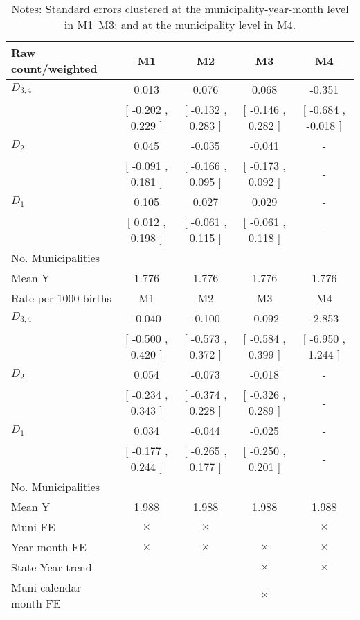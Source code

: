 \begin{table}[!ht]
\centering
\caption{Effects of Drought on very_preterm}\label{tab:twfe_very_preterm}
\fontsize{10pt}{12pt}\selectfont
\begin{tabular}{lcccc}
\toprule
  Raw count/weighted &\multicolumn{1}{c}{M1}&\multicolumn{1}{c}{M2}&\multicolumn{1}{c}{M3}&\multicolumn{1}{c}{M4} \\
\midrule
 $ D_{3,4} $ &     0.013 &     0.076 &     0.068 &    -0.351 \\ 
 & [    -0.202 ,     0.229 ] & [    -0.132 ,     0.283 ] & [    -0.146 ,     0.282 ] & [    -0.684 ,    -0.018 ] \\ 
\addlinespace
 $ D_2 $ &     0.045 &    -0.035 &    -0.041 & - \\ 
 & [    -0.091 ,     0.181 ] & [    -0.166 ,     0.095 ] & [    -0.173 ,     0.092 ] & - \\ 
\addlinespace
 $ D_1 $ &     0.105 &     0.027 &     0.029 & - \\ 
 & [     0.012 ,     0.198 ] & [    -0.061 ,     0.115 ] & [    -0.061 ,     0.118 ] & - \\ 
\addlinespace
\midrule
  No. Municipalities &  &  &  &   \\
  Mean Y &     1.776 &     1.776 &     1.776 &     1.776  \\
\addlinespace
\midrule
  Rate per 1000 births &\multicolumn{1}{c}{M1}&\multicolumn{1}{c}{M2}&\multicolumn{1}{c}{M3}&\multicolumn{1}{c}{M4} \\
\midrule
 $ D_{3,4} $ &    -0.040 &    -0.100 &    -0.092 &    -2.853 \\ 
 & [    -0.500 ,     0.420 ] & [    -0.573 ,     0.372 ] & [    -0.584 ,     0.399 ] & [    -6.950 ,     1.244 ] \\ 
\addlinespace
 $ D_2 $ &     0.054 &    -0.073 &    -0.018 & - \\ 
 & [    -0.234 ,     0.343 ] & [    -0.374 ,     0.228 ] & [    -0.326 ,     0.289 ] & - \\ 
\addlinespace
 $ D_1 $ &     0.034 &    -0.044 &    -0.025 & - \\ 
 & [    -0.177 ,     0.244 ] & [    -0.265 ,     0.177 ] & [    -0.250 ,     0.201 ] & - \\ 
\midrule
  No. Municipalities &  &  &  &   \\
  Mean Y &     1.988 &     1.988 &     1.988 &     1.988  \\
  Muni FE & $ \times $ & $ \times $ &  & $ \times $  \\
  Year-month FE & $ \times $ & $ \times $ & $ \times $ & $ \times $ \\
  State-Year trend &  &  & $ \times $ & $ \times $ \\
  Muni-calendar month FE &  &  & $ \times $ & \\
\bottomrule
\end{tabular}
\caption*{\footnotesize{Notes: Standard errors clustered at the municipality-year-month level in M1--M3; and at the municipality level in M4.}}
\end{table}
